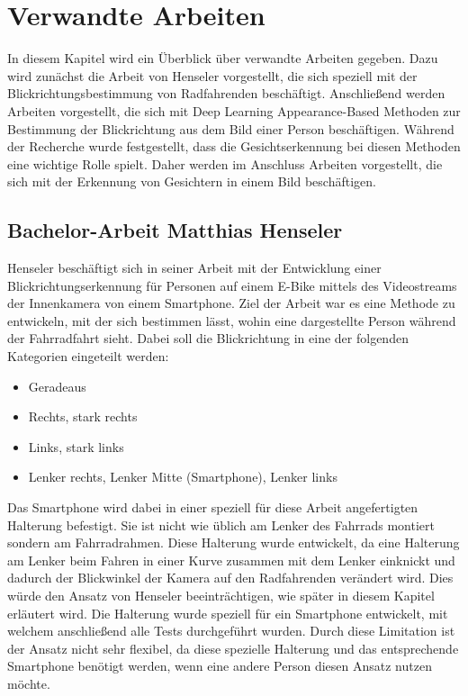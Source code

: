 \chapter{Verwandte Arbeiten}\label{sec:related}

In diesem Kapitel wird ein Überblick über verwandte Arbeiten gegeben. Dazu wird zunächst die Arbeit von Henseler \cite{bachelor:henseler:gaze-ebikes} vorgestellt, die sich speziell mit der Blickrichtungsbestimmung von Radfahrenden beschäftigt. Anschließend werden Arbeiten vorgestellt, die sich mit Deep Learning Appearance-Based Methoden zur Bestimmung der Blickrichtung aus dem Bild einer Person beschäftigen. Während der Recherche wurde festgestellt, dass die Gesichtserkennung bei diesen Methoden eine wichtige Rolle spielt. Daher werden im Anschluss Arbeiten vorgestellt, die sich mit der Erkennung von Gesichtern in einem Bild beschäftigen.

\section{Bachelor-Arbeit Matthias Henseler}\label{sec:related:henseler}

Henseler beschäftigt sich in seiner Arbeit \cite{bachelor:henseler:gaze-ebikes} mit der Entwicklung einer Blickrichtungserkennung für Personen auf einem E-Bike mittels des Videostreams der Innenkamera von einem Smartphone. Ziel der Arbeit war es eine Methode zu entwickeln, mit der sich bestimmen lässt, wohin eine dargestellte Person während der Fahrradfahrt sieht. Dabei soll die Blickrichtung in eine der folgenden Kategorien eingeteilt werden:

\begin{itemize}
\item Geradeaus
\item Rechts, stark rechts
\item Links, stark links
\item Lenker rechts, Lenker Mitte (Smartphone), Lenker links
\end{itemize}

Das Smartphone wird dabei in einer speziell für diese Arbeit angefertigten Halterung befestigt. Sie ist nicht wie üblich am Lenker des Fahrrads montiert sondern am Fahrradrahmen. Diese Halterung wurde entwickelt, da eine Halterung am Lenker beim Fahren in einer Kurve zusammen mit dem Lenker einknickt und dadurch der Blickwinkel der Kamera auf den Radfahrenden verändert wird. Dies würde den Ansatz von Henseler beeinträchtigen, wie später in diesem Kapitel erläutert wird. Die Halterung wurde speziell für ein Smartphone entwickelt, mit welchem anschließend alle Tests durchgeführt wurden. Durch diese Limitation ist der Ansatz nicht sehr flexibel, da diese spezielle Halterung und das entsprechende Smartphone benötigt werden, wenn eine andere Person diesen Ansatz nutzen möchte. 

